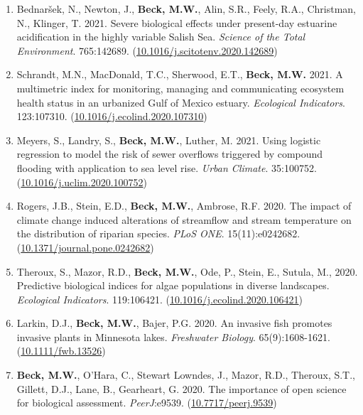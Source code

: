 \documentclass[letterpaper,12pt]{article}
\begin{document}
\begin{enumerate}
\item Bednar\v{s}ek, N., Newton, J., \textbf{Beck, M.W.}, Alin, S.R., Feely, R.A., Christman, N., Klinger, T. 2021. Severe biological effects under present-day estuarine acidification in the highly variable {S}alish {S}ea. \textit{Science of the Total Environment}. 765:142689. ({\footnotesize\href{https://doi.org/10.1016/j.scitotenv.2020.142689}{10.1016/j.scitotenv.2020.142689}})

\item Schrandt, M.N., MacDonald, T.C., Sherwood, E.T., \textbf{Beck, M.W.} 2021. A multimetric index for monitoring, managing and communicating ecosystem health status in an urbanized Gulf of Mexico estuary. \textit{Ecological Indicators}. 123:107310. ({\footnotesize\href{https://doi.org/10.1016/j.ecolind.2020.107310}{10.1016/j.ecolind.2020.107310}})

\item Meyers, S., Landry, S., \textbf{Beck, M.W.}, Luther, M. 2021. Using logistic regression to model the risk of sewer overflows triggered by compound flooding with application to sea level rise. \textit{Urban Climate}. 35:100752. ({\footnotesize\href{https://doi.org/10.1016/j.uclim.2020.100752}{10.1016/j.uclim.2020.100752}})

\item Rogers, J.B., Stein, E.D., \textbf{Beck, M.W.}, Ambrose, R.F. 2020. The impact of climate change induced alterations of streamflow and stream temperature on the distribution of riparian species. \textit{PLoS ONE}. 15(11):e0242682. ({\footnotesize\href{https://doi.org/10.1371/journal.pone.0242682}{10.1371/journal.pone.0242682}})

\item Theroux, S., Mazor, R.D., \textbf{Beck, M.W.}, Ode, P., Stein, E., Sutula, M., 2020. Predictive biological indices for algae populations in diverse landscapes. \textit{Ecological Indicators}. 119:106421. ({\footnotesize\href{https://doi.org/10.1016/j.ecolind.2020.106421}{10.1016/j.ecolind.2020.106421}})

\item Larkin, D.J., \textbf{Beck, M.W.}, Bajer, P.G. 2020. An invasive fish promotes invasive plants in Minnesota lakes. \textit{Freshwater Biology}. 65(9):1608-1621. ({\footnotesize\href{https://doi.org/10.1111/fwb.13526}{10.1111/fwb.13526}})

\item \textbf{Beck, M.W.}, O'Hara, C., Stewart Lowndes, J., Mazor, R.D., Theroux, S.T., Gillett, D.J., Lane, B., Gearheart, G. 2020. The importance of open science for biological assessment. \textit{PeerJ}:e9539. ({\footnotesize\href{https://doi.org/10.7717/peerj.9539}{10.7717/peerj.9539}})


\end{enumerate}
\end{document}
